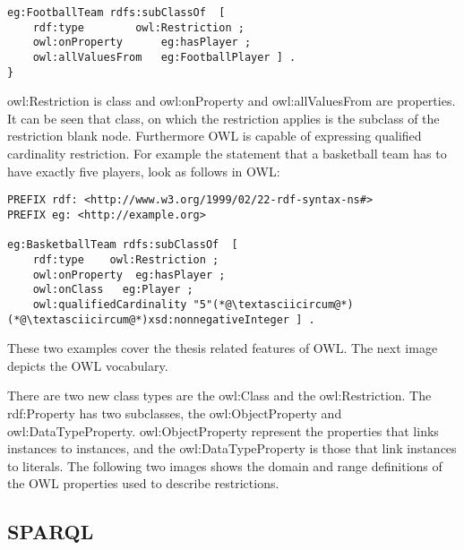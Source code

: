 \begin{lstlisting}[captionpos=b, caption=OWL restriction in N3 format, label=lst:sparql,
basicstyle=\ttfamily,frame=single]
eg:FootballTeam rdfs:subClassOf  [ 
	rdf:type		owl:Restriction ; 
	owl:onProperty		eg:hasPlayer ; 
	owl:allValuesFrom	eg:FootballPlayer ] . 
}
\end{lstlisting}

owl:Restriction is class and owl:onProperty and owl:allValuesFrom are properties. It can be seen that class, on which the restriction applies is the subclass of the restriction blank node.
Furthermore OWL is capable of expressing qualified cardinality restriction. For example the statement that a basketball team has to have exactly five players, look as follows in OWL:


\begin{lstlisting}[captionpos=b, caption=OWL restriction in N3 format, label=lst:sparql,
basicstyle=\ttfamily,frame=single]
PREFIX rdf: <http://www.w3.org/1999/02/22-rdf-syntax-ns#>
PREFIX eg: <http://example.org> 

eg:BasketballTeam rdfs:subClassOf  [
	rdf:type	owl:Restriction ; 
	owl:onProperty	eg:hasPlayer ; 
	owl:onClass	  eg:Player ; 
	owl:qualifiedCardinality "5"(*@\textasciicircum@*)(*@\textasciicircum@*)xsd:nonnegativeInteger ] . 

\end{lstlisting}



These two examples cover the thesis related features of OWL. The next image depicts the OWL vocabulary. 



There are two new class types are the owl:Class and the owl:Restriction. The rdf:Property has two subclasses, the owl:ObjectProperty and owl:DataTypeProperty. owl:ObjectProperty represent the properties that links instances to instances, and the owl:DataTypeProperty is those that link instances to literals. The following two images shows the domain and range definitions of the OWL properties used to describe restrictions.


\subsection{SPARQL}

